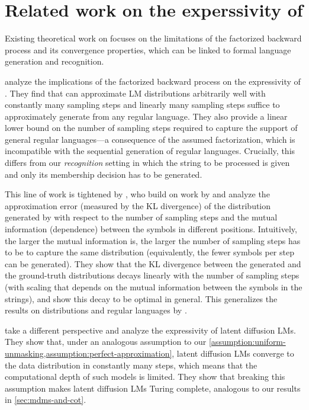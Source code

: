 
\appendix

\section{Related work on the experssivity of \MDMsAcr} \label{app:related-work}

Existing theoretical work on \MDMsAcr focuses on the limitations of the factorized backward process and its convergence properties, which can be linked to formal language generation and recognition.

\citet{feng2025theoreticalbenefitlimitationdiffusion} analyze the implications of the factorized backward process on the expressivity of \MDMsAcr.
They find that \MDMsAcr can approximate \ngram LM distributions arbitrarily well with constantly many sampling steps and linearly many sampling steps suffice to approximately generate from any regular language. 
They also provide a linear lower bound on the number of sampling steps required to capture the support of general regular languages---a consequence of the assumed factorization, which is incompatible with the sequential generation of regular languages.
Crucially, this differs from our \emph{recognition} setting in which the string to be processed is given and only its membership decision has to be generated.

This line of work is tightened by \citet{li2025convergencetheorydiffusionlanguage}, who build on work by \citet{chen2024convergenceanalysisdiscretediffusion} and analyze the approximation error (measured by the KL divergence) of the distribution generated by \MDMsAcr with respect to the number of sampling steps and the mutual information (dependence) between the symbols in different positions.
Intuitively, the larger the mutual information is, the larger the number of sampling steps has to be to capture the same distribution (equivalently, the fewer symbols per step can be generated).
They show that the KL divergence between the generated and the ground-truth distributions decays linearly with the number of sampling steps (with scaling that depends on the mutual information between the symbols in the strings), and show this decay to be optimal in general.
This generalizes the results on \ngram distributions and regular languages by \citet{feng2025theoreticalbenefitlimitationdiffusion}.

\citet{liu2025perfectdiffusionmathsftc0,liu2025serialscalinghypothesis} take a different perspective and analyze the expressivity of latent diffusion LMs.
They show that, under an analogous assumption to our \cref{assumption:uniform-unmasking,assumption:perfect-approximation}, latent diffusion LMs converge to the data distribution in constantly many steps, which means that the computational depth of such models is limited.
They show that breaking this assumption makes latent diffusion LMs Turing complete, analogous to our results in \cref{sec:mdms-and-cot}.

